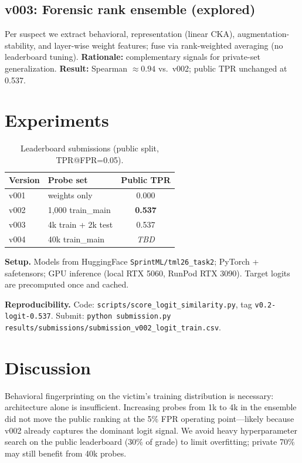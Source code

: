 \documentclass[10pt,twocolumn]{article}
\begin{document}
\subsection{v003: Forensic rank ensemble (explored)}
Per suspect we extract behavioral, representation (linear CKA), augmentation-stability, and layer-wise weight features; fuse via rank-weighted averaging (no leaderboard tuning).
\textbf{Rationale:} complementary signals for private-set generalization.
\textbf{Result:} Spearman $\approx 0.94$ vs.\ v002; public TPR unchanged at 0.537.

\section{Experiments}
\begin{table}[t]
  \centering
  \caption{Leaderboard submissions (public split, TPR@FPR=0.05).}
  \label{tab:results}
  \small
  \begin{tabular}{@{}llc@{}}
    \toprule
    Version & Probe set & Public TPR \\
    \midrule
    v001 & weights only & 0.000 \\
    v002 & 1{,}000 train\_main & \textbf{0.537} \\
    v003 & 4k train + 2k test & 0.537 \\
    v004 & 40k train\_main & \textit{TBD} \\
    \bottomrule
  \end{tabular}
\end{table}

\textbf{Setup.} Models from HuggingFace \texttt{SprintML/tml26\_task2}; PyTorch + safetensors; GPU inference (local RTX 5060, RunPod RTX 3090).
Target logits are precomputed once and cached.

\textbf{Reproducibility.} Code: \texttt{scripts/score\_logit\_similarity.py}, tag \texttt{v0.2-logit-0.537}.
Submit: \texttt{python submission.py results/submissions/submission\_v002\_logit\_train.csv}.

\section{Discussion}
Behavioral fingerprinting on the victim's training distribution is necessary: architecture alone is insufficient.
Increasing probes from 1k to 4k in the ensemble did not move the public ranking at the 5\% FPR operating point---likely because v002 already captures the dominant logit signal.
We avoid heavy hyperparameter search on the public leaderboard (30\% of grade) to limit overfitting; private 70\% may still benefit from 40k probes.
\end{document}
